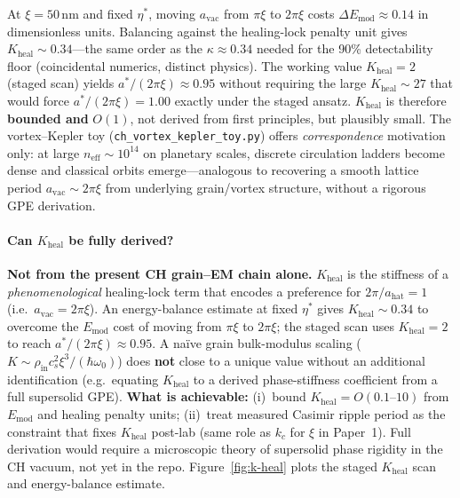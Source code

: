 \documentclass[11pt,a4paper]{article}
\begin{document}
At $\xi = 50$\,nm and fixed $\eta^*$, moving $a_{\mathrm{vac}}$ from $\pi\xi$ to $2\pi\xi$ costs
$\Delta E_{\mathrm{mod}} \approx 0.14$ in dimensionless units.
Balancing against the healing-lock penalty unit gives $K_{\mathrm{heal}} \sim 0.34$---the same order as
the $\kappa \approx 0.34$ needed for the 90\% detectability floor (coincidental numerics, distinct physics).
The working value $K_{\mathrm{heal}} = 2$ (staged scan) yields $a^*/(2\pi\xi) \approx 0.95$ without requiring the
large $K_{\mathrm{heal}} \sim 27$ that would force $a^*/(2\pi\xi) = 1.00$ exactly under the staged ansatz.
$K_{\mathrm{heal}}$ is therefore \textbf{bounded and} $O(1)$, not derived from first principles, but plausibly small.
The vortex--Kepler toy (\texttt{ch\_vortex\_kepler\_toy.py}) offers \emph{correspondence} motivation only:
at large $n_{\mathrm{eff}} \sim 10^{14}$ on planetary scales, discrete circulation ladders become dense and classical orbits emerge---analogous to recovering a smooth lattice period $a_{\mathrm{vac}} \sim 2\pi\xi$ from underlying grain/vortex structure, without a rigorous GPE derivation.

\paragraph{Can $K_{\mathrm{heal}}$ be fully derived?}
\textbf{Not from the present CH grain--EM chain alone.}
$K_{\mathrm{heal}}$ is the stiffness of a \emph{phenomenological} healing-lock term that encodes a preference for $2\pi/a_{\mathrm{hat}}=1$ (i.e.\ $a_{\mathrm{vac}}=2\pi\xi$).
An energy-balance estimate at fixed $\eta^*$ gives $K_{\mathrm{heal}} \sim 0.34$ to overcome the $E_{\mathrm{mod}}$ cost of moving from $\pi\xi$ to $2\pi\xi$; the staged scan uses $K_{\mathrm{heal}}=2$ to reach $a^*/(2\pi\xi)\approx 0.95$.
A na\"ive grain bulk-modulus scaling ($K \sim \rho_{\mathrm{in}} c_s^2 \xi^3 / (\hbar\omega_0)$) does \textbf{not} close to a unique value without an additional identification (e.g.\ equating $K_{\mathrm{heal}}$ to a derived phase-stiffness coefficient from a full supersolid GPE).
\textbf{What is achievable:} (i)~bound $K_{\mathrm{heal}} = O(0.1\text{--}10)$ from $E_{\mathrm{mod}}$ and healing penalty units; (ii)~treat measured Casimir ripple period as the constraint that fixes $K_{\mathrm{heal}}$ post-lab (same role as $k_c$ for $\xi$ in Paper~1).
Full derivation would require a microscopic theory of supersolid phase rigidity in the CH vacuum, not yet in the repo.
Figure~\ref{fig:k-heal} plots the staged $K_{\mathrm{heal}}$ scan and energy-balance estimate.
\end{document}
